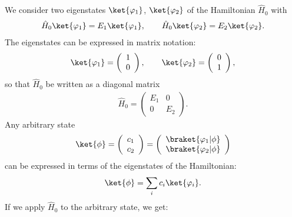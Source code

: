 			We consider two eigenstates $\ket{\varphi_1}$, $\ket{\varphi_2}$ of the Hamiltonian $\hat{H}_0$ with
			\begin{align}
				\hat{H}_0\ket{\varphi_1}=E_1\ket{\varphi_1}, \qquad \hat{H}_0\ket{\varphi_2}=E_2\ket{\varphi_2}.
			\end{align}
			The eigenstates can be expressed in matrix notation:
			\begin{align}
				\ket{\varphi_1}=\left( \begin{array}{c} 1 \\ 0 \end{array} \right), \qquad \ket{\varphi_2}=\left( \begin{array}{c} 0 \\ 1 \end{array} \right),
			\end{align}
			so that $\hat{H}_0$ be written as a diagonal matrix
			\begin{align}
				\hat{H}_0 = \left(\begin{array}{cc} E_1 & 0 \\ 0 & E_2 \end{array}\right).
			\end{align}
			Any arbitrary state 
			\begin{align}
				\ket{\phi} = \left( \begin{array}{c} c_1 \\ c_2 \end{array} \right) = \left( \begin{array}{c} \braket{\varphi_1|\phi} \\ \braket{\varphi_2|\phi} \end{array} \right)
			\end{align}
			can be expressed in terms of the eigenstates of the Hamiltonian:
			\begin{align}
				\ket{\phi} = \sum_i c_i \ket{\varphi_i}.
			\end{align}
			If we apply $\hat{H}_0$ to the arbitrary state, we get:

